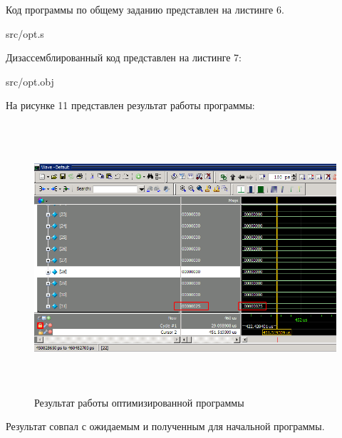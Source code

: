 Код программы по общему заданию представлен на листинге 6.

\FloatBarrier
\begin{lstinputlisting}[caption=Оптимизированный код индивидуального задания, 
	linerange={1, 33}, basicstyle=\footnotesize\ttfamily, frame=single, breaklines=true]{src/opt.s}
\end{lstinputlisting}
\FloatBarrier

Дизассемблированный код представлен на листинге 7:

\FloatBarrier
\begin{lstinputlisting}[caption=Дизассемблированный код, 
	linerange={1, 41}, basicstyle=\footnotesize\ttfamily, frame=single, breaklines=true]{src/opt.obj}
\end{lstinputlisting}
\FloatBarrier

На рисунке 11 представлен результат работы программы:
\FloatBarrier
\begin{figure}[h]
	\begin{center}
		\includegraphics[width=\linewidth, height=10cm]{inc/opt_result.png}
	\end{center}
	\caption{Результат работы оптимизированной программы}
\end{figure}
\FloatBarrier

Результат совпал с ожидаемым и полученным для начальной программы.

